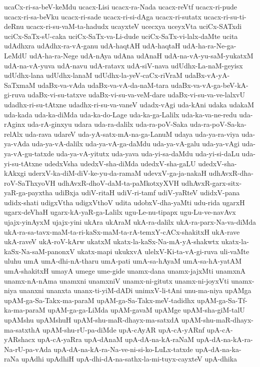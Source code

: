 {ucaCx-ri-sa-beV-keMdu
ucacx-Lisi
ucacx-ra-Nada
ucacx-reVtf
ucacx-ri-pude
ucacx-ri-sa-beVku
ucacx-ri-sade
ucacx-ri-si-dAga
ucacx-ri-sutatx
ucacx-ri-su-ti-deRnu
ucacx-ri-su-vaM-ta-hadudx
ucayxteV
ucecxya
uceyxVta
uciCx-SATxdi
uciCx-SaTx-sU-caka
uciCx-SaTx-va-Li-dude
uciCx-SaTx-vi-lalx-daMte
ucita
udAdhxra
udAdhx-ra-vA-ganu
udA-haqtAH
udA-haqtaH
udA-ha-ra-Ne-ga-LeMdU
udA-ha-ra-Nege
udA-nAya
udAna
udAnaH
udA-na-vA-yu-saM-yukatxM
udA-na-vA-yuva
udA-navu
udA-ratavx
udA-siV-nava
udUdhx-La-naM-geyisx
udUdhx-lana
udUdhx-lanaM
udUdhx-la-yeV-caCx-riVraM
udaBx-vA-yA-SaTxmaM
udaBx-va-vAda
udaBx-va-vA-da-naM-tara
udaBx-va-vA-ga-beV-kA-gi-ruva
udaBx-vi-su-tatxve
udaBx-vi-su-va-veM-dare
udaBx-vi-su-va-ve-lalxvU
udadhx-ri-su-tAtxne
udadhx-ri-su-va-vaneV
udadx-vAgi
uda-kAni
udaka
udakaM
uda-kada
uda-ka-diMda
uda-ka-do-Lage
uda-ka-ga-Lalilx
uda-ka-va-ne-redu
uda-rAginx
uda-rA-ginxyu
udara
uda-ra-dalilx
uda-ra-poV-Saka
uda-ra-poV-Sa-ka-relAlx
uda-rava
udareV
uda-yA-satx-mA-na-ga-LanuM
udaya
uda-ya-ra-viya
uda-ya-vAda
uda-ya-vA-dalilx
uda-ya-vA-ga-daMdu
uda-ya-vA-galu
uda-ya-vAgi
uda-ya-vA-gu-tatxde
uda-ya-vA-yitutx
uda-yava
uda-yi-sa-daMdu
uda-yi-si-daLu
uda-yi-su-tAtxne
udedxVsha
udedxV-sha-diMda
udedxV-sha-gaLU
udedxV-sha-kAkxgi
uderxV-ka-diM-diV-ke-yu-da-ramaM
udevxV-ga-ja-nakaH
udhAvxR-dha-roV-SaThxyoVH
udhAvxR-dhoV-daM-ta-paMkotxyXVH
udhAvxR-garx-sitx-yaR-ga-payxtha
udiBxja
udiV-ritaH
udiV-ri-tamf
udiV-yaRteV
udidxV-pana
udidx-shati
udigxVtha
udigxVthoV
udita
udobxV-dha-yaMti
udu-rida
ugarxH
ugarx-deVhaH
ugarx-kA-yaR-ga-Lalilx
ugu-Le-nu-tipapx
ugu-Lu-ve-navAvx
ujajx-yinAyxM
ujajx-yini
ukAra
ukAraM
ukA-ra-dalilx
ukA-ra-parx-Na-va-diMda
ukA-ra-sa-tavx-maM-ta-ri-kaSx-maM-ta-rA-temxY-cACx-shakitxH
ukA-rave
ukA-raveV
ukA-roV-kArw
ukatxM
ukatx-la-kaSx-Na-mA-yA-shakwtx
ukatx-la-kaSx-Na-saM-panonxV
ukatx-mapi
ukukxvA
ulelxV-Ki-ta-vA-gi-ruva
uli-vaMte
uluhu
umA
umA-dhi-nA-tharu
umA-pati
umA-sa-hAyaM
umA-sa-hA-yatAM
umA-shakitxH
umayA
umege
ume-gide
unamx-dana
unamx-jajxMti
unamxnA
unamx-nA-nAma
unamxni
unamxniV
unamx-ni-gitutx
unamx-ni-joyxVti
unamx-niya
unanxni
unanxta
unanx-ti-yiM-dADi
unimxV-li-tAni
unu-ma-niya
upAMga
upAM-ga-Sa-Takx-ma-paraM
upAM-ga-Sa-Takx-meV-tadidhx
upAM-ga-Sa-Tf-ka-ma-paraM
upAM-ga-ga-LiMda
upAM-gavaM
upAMge
upAM-sha-giM-talU
upAMshu
upAMshuH
upAM-shu-maR-dhayx-ma-satxdA
upAM-shu-maR-dhayx-ma-satxthA
upAM-shu-rU-pa-diMde
upA-cAyAR
upA-cA-yARnf
upA-cA-yARshacx
upA-cA-yaRra
upA-dAnaM
upA-dA-na-kA-raNaM
upA-dA-na-kA-ra-Na-rU-pa-vAda
upA-dA-na-kA-ra-Na-ve-ni-si-ko-LuLx-tatxde
upA-dA-na-ka-raNa
upAdhi
upAdhiH
upA-dhi-dA-na-sathx-la-mi-tuyx-cayxteV
upA-dhika
}
